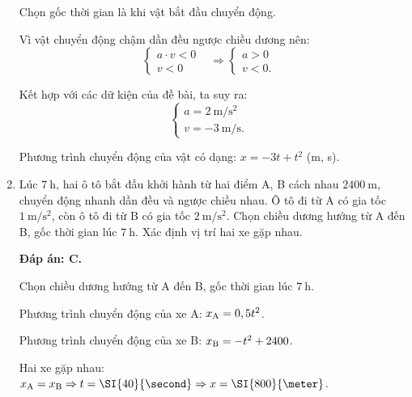 \begin{enumerate}[label=\bfseries Câu \arabic*:]
{		Chọn gốc thời gian là khi vật bắt đầu chuyển động.
		
		Vì vật chuyển động chậm dần đều ngược chiều dương nên:
		\begin{equation*}
			\left\{\begin{array}{ll}{a\cdot v <0}&\\{v < 0}&\end{array}\right.\Rightarrow \left\{\begin{array}{ll}{a > 0}&\\{v < 0.}&\end{array}\right.
		\end{equation*}
		
		Kết hợp với các dữ kiện của đề bài, ta suy ra:
		\begin{equation*}
			\left\{\begin{array}{ll}{a=\SI{2}{\meter/\second^2}}&\\{v=\SI{-3}{\meter/\second} .}&\end{array}\right.
		\end{equation*}
		
		Phương trình chuyển động của vật có dạng:
		$x=-3t+t^2$ (m, s).
	}
	\item {}
	
	{Lúc $\SI{7}{\hour}$, hai ô tô bắt đầu khởi hành từ hai điểm A, B cách nhau $\SI{2400}{\meter}$, chuyển động nhanh dần đều và ngược chiều nhau. Ô tô đi từ A có gia tốc $\SI{1}{\meter / \second \squared}$, còn ô tô đi từ B có gia tốc $\SI{2}{\meter / \second \squared}$. Chọn chiều dương hướng từ A đến B, gốc thời gian lúc $\SI{7}{\hour}$. Xác định vị trí hai xe gặp nhau.
	}
	\hideall
	{	\textbf{Đáp án: C.}
		
		Chọn chiều dương hướng từ A đến B, gốc thời gian lúc $\SI{7}{\hour}$.
		
		Phương trình chuyển động của xe A: $x_\text A = 0,5t^2$.
		
		Phương trình chuyển động của xe B: $x_\text B=-t^2 + 2400$.
		
		Hai xe gặp nhau: $x_\text A = x_\text B \Rightarrow t = \SI{40}{\second} \Rightarrow x=\SI{800}{\meter}$.
	}
	

\end{enumerate}
